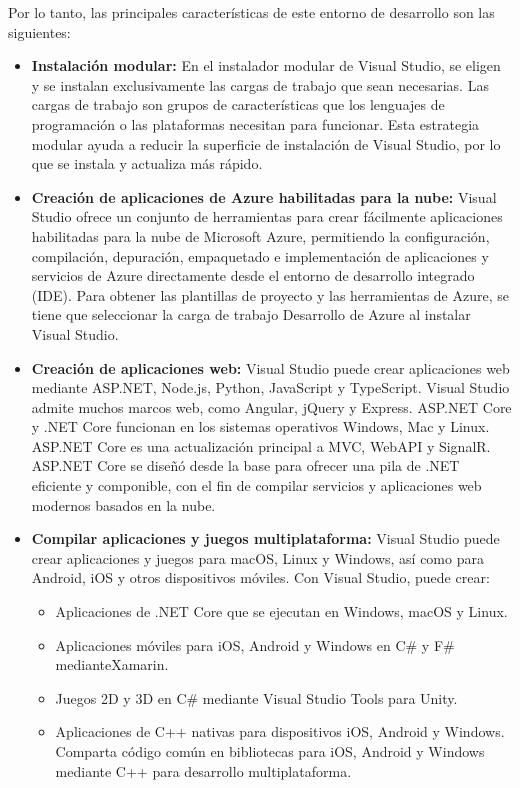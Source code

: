 Por lo tanto, las principales características de este entorno de desarrollo son las siguientes:\cite{vs2022LearnCar}
\begin{itemize}
    \item \textbf{Instalación modular:} En el instalador modular de Visual
    Studio, se eligen y se instalan exclusivamente las cargas de trabajo que
    sean necesarias. Las cargas de trabajo son grupos de características que los
    lenguajes de programación o las plataformas necesitan para funcionar. Esta
    estrategia modular ayuda a reducir la superficie de instalación de Visual
    Studio, por lo que se instala y actualiza más rápido.
    \item \textbf{Creación de aplicaciones de Azure habilitadas para la nube: }
    Visual Studio ofrece un conjunto de herramientas para crear fácilmente
    aplicaciones habilitadas para la nube de Microsoft Azure, permitiendo la
    configuración, compilación, depuración, empaquetado e implementación de
    aplicaciones y servicios de Azure directamente desde el entorno de
    desarrollo integrado (IDE). Para obtener las plantillas de proyecto y las
    herramientas de Azure, se tiene que seleccionar la carga de trabajo
    Desarrollo de Azure al instalar Visual Studio.
    \item \textbf{Creación de aplicaciones web: } Visual Studio puede crear
    aplicaciones web mediante ASP.NET, Node.js, Python, JavaScript y TypeScript.
    Visual Studio admite muchos marcos web, como Angular, jQuery y Express.
    ASP.NET Core y .NET Core funcionan en los sistemas operativos Windows, Mac y
    Linux. ASP.NET Core es una actualización principal a MVC, WebAPI y SignalR.
    ASP.NET Core se diseñó desde la base para ofrecer una pila de .NET eficiente
    y componible, con el fin de compilar servicios y aplicaciones web modernos
    basados en la nube.
    \item \textbf{Compilar aplicaciones y juegos multiplataforma: } Visual
    Studio puede crear aplicaciones y juegos para macOS, Linux y Windows, así
    como para Android, iOS y otros dispositivos móviles. Con Visual Studio,
    puede crear: 
    \begin{itemize}
        \item Aplicaciones de .NET Core que se ejecutan en Windows, macOS y
        Linux.
        \item Aplicaciones móviles para iOS, Android y Windows en C\# y F\#
        medianteXamarin.
        \item Juegos 2D y 3D en C\# mediante Visual Studio Tools para Unity.
        \item Aplicaciones de C++ nativas para dispositivos iOS, Android y
        Windows. Comparta código común en bibliotecas para iOS, Android y
        Windows mediante C++ para desarrollo multiplataforma.
    

\end{itemize}
\end{itemize}
